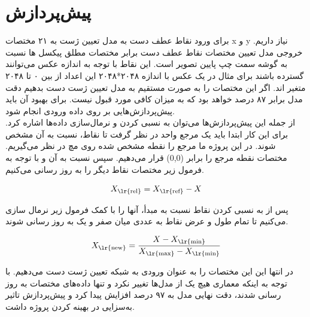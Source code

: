 \section{پیش‌پردازش}
برای ورود نقاط عطف دست به مدل تعیین ژست به ۲۱ مختصات x و y نیاز داریم. خروجی مدل تعیین مختصات نقاط عطف دست برابر مختصات مطلق پیکسل ها نسبت به گوشه سمت 
چپ پایین تصویر است. این نقاط با توجه به اندازه عکس می‌توانند گسترده باشند برای مثال در یک عکس با اندازه ۲۰۴۸*۲۰۴۸ این اعداد از بین ۰ تا ۲۰۴۸ متغیر اند. 
اگر این مختصات را به صورت مستقیم به مدل تعیین ژست دست بدهیم دقت مدل برابر ۸۷ درصد خواهد بود که به میزان کافی مورد قبول نیست. برای بهبود آن باید پیش‌پردازش‌هایی بر روی داده ورودی انجام شود. 
\\
از جمله این پیش‌پردازش‌ها می‌توان به نسبی کردن و نرمال‌سازی داده‌ها اشاره کرد. برای این کار ابتدا باید یک مرجع واحد در نظر گرفت تا نقاط، نسبت به آن مشخص شوند. در این پروژه ما مرجع را نقطه 
مشخص شده روی مچ در نظر می‌گیریم. مختصات نقطه مرجع را برابر (0,0)  قرار می‌دهیم. سپس نسبت به آن و با توجه به فرمول زیر مختصات نقاط دیگر را به روز رسانی می‌کنیم.

\[ X_{\text{\lr{rel}}} = X_{\text{\lr{ref}}} - X \]


پس از به نسبی کردن نقاط نسبت به مبدأ، آنها را با کمک فرمول زیر نرمال سازی می‌کنیم تا تمام طول و عرض نقاط به عددی میان صفر و یک به روز رسانی شوند.

\[ X_{\text{\lr{new}}} = \frac{X - X_{\text{\lr{min}}}}{X_{\text{\lr{max}}} - X_{\text{\lr{min}}}} \]

در انتها این این مختصات را به عنوان ورودی به شبکه تعیین ژست دست می‌دهیم. با توجه به اینکه معماری هیچ یک از مدل‌ها تغییر نکرد و تنها داده‌های مختصات به روز رسانی شدند، 
دقت نهایی مدل به ۹۷ درصد افزایش پیدا کرد و پیش‌پردازش تاثیر به‌سزایی در بهینه کردن پروژه داشت.



